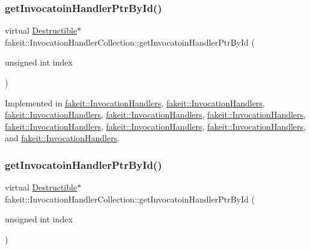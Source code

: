 \subsubsection{\texorpdfstring{getInvocatoinHandlerPtrById()}{getInvocatoinHandlerPtrById()}\hspace{0.1cm}{\footnotesize\ttfamily [1/9]}}
{\footnotesize\ttfamily virtual \mbox{\hyperlink{classfakeit_1_1Destructible}{Destructible}}$\ast$ fakeit\+::\+Invocation\+Handler\+Collection\+::get\+Invocatoin\+Handler\+Ptr\+By\+Id (\begin{DoxyParamCaption}\item[{unsigned int}]{index }\end{DoxyParamCaption})\hspace{0.3cm}{\ttfamily [pure virtual]}}



Implemented in \mbox{\hyperlink{classfakeit_1_1InvocationHandlers_a47af368f009fc5e3cce950ebbab4c48d}{fakeit\+::\+Invocation\+Handlers}}, \mbox{\hyperlink{classfakeit_1_1InvocationHandlers_a47af368f009fc5e3cce950ebbab4c48d}{fakeit\+::\+Invocation\+Handlers}}, \mbox{\hyperlink{classfakeit_1_1InvocationHandlers_a47af368f009fc5e3cce950ebbab4c48d}{fakeit\+::\+Invocation\+Handlers}}, \mbox{\hyperlink{classfakeit_1_1InvocationHandlers_a47af368f009fc5e3cce950ebbab4c48d}{fakeit\+::\+Invocation\+Handlers}}, \mbox{\hyperlink{classfakeit_1_1InvocationHandlers_a47af368f009fc5e3cce950ebbab4c48d}{fakeit\+::\+Invocation\+Handlers}}, \mbox{\hyperlink{classfakeit_1_1InvocationHandlers_a47af368f009fc5e3cce950ebbab4c48d}{fakeit\+::\+Invocation\+Handlers}}, \mbox{\hyperlink{classfakeit_1_1InvocationHandlers_a47af368f009fc5e3cce950ebbab4c48d}{fakeit\+::\+Invocation\+Handlers}}, \mbox{\hyperlink{classfakeit_1_1InvocationHandlers_a47af368f009fc5e3cce950ebbab4c48d}{fakeit\+::\+Invocation\+Handlers}}, and \mbox{\hyperlink{classfakeit_1_1InvocationHandlers_a47af368f009fc5e3cce950ebbab4c48d}{fakeit\+::\+Invocation\+Handlers}}.

\mbox{\label{structfakeit_1_1InvocationHandlerCollection_aa0bb622369d838f8c4daa93a8b992b57}} 
\subsubsection{\texorpdfstring{getInvocatoinHandlerPtrById()}{getInvocatoinHandlerPtrById()}\hspace{0.1cm}{\footnotesize\ttfamily [2/9]}}
{\footnotesize\ttfamily virtual \mbox{\hyperlink{classfakeit_1_1Destructible}{Destructible}}$\ast$ fakeit\+::\+Invocation\+Handler\+Collection\+::get\+Invocatoin\+Handler\+Ptr\+By\+Id (\begin{DoxyParamCaption}\item[{unsigned int}]{index }\end{DoxyParamCaption})\hspace{0.3cm}{\ttfamily [pure virtual]}}



